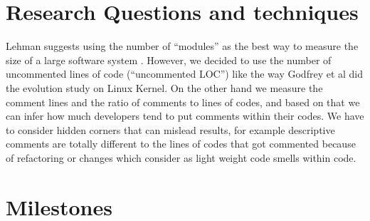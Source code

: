 \documentclass[conference]{IEEEtran}
\begin{document}
	\section{Research Questions and techniques}
	Lehman suggests using the number of “modules” as the best way to measure the size of a large software system \cite{637156}. However, we decided to use the number of uncommented lines of code (“uncommented LOC”) like the way Godfrey et al \cite{883030} did the evolution study on Linux Kernel. On the other hand we measure the comment lines and the ratio of comments to lines of codes, and based on that we can infer how much developers tend to put comments within their codes. We have to consider hidden corners that can mislead results, for example descriptive comments are totally different to the lines of codes that got commented because of refactoring or changes which consider as light weight code smells within code.
	

	
	
	\label{sec:rq}
	
	\section{Milestones}
	
	
	
\end{document}
